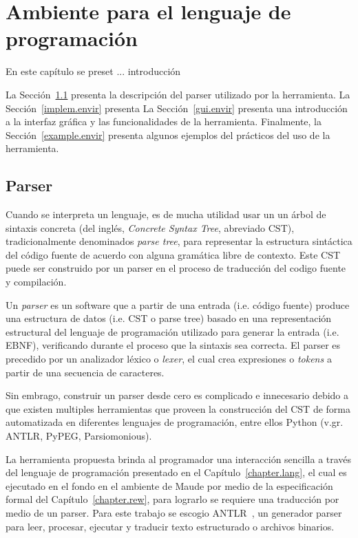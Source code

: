 
\chapter{Ambiente para el lenguaje de programaci\'on}
\label{chapter.envir}


En este cap\'itulo se preset
... introducci\'on

La Secci\'on~\ref{parser.envir} presenta la descripci\'on del parser utilizado por la herramienta. La Secci\'on~\ref{implem.envir} presenta  
La Secci\'on~\ref{gui.envir} presenta una introducci\'on a la interfaz gr\'afica y las funcionalidades de la herramienta. Finalmente, la Secci\'on~\ref{example.envir} presenta algunos ejemplos del pr\'acticos del uso de la herramienta.

\section{Parser}
\label{parser.envir}

Cuando se interpreta un lenguaje, es de mucha utilidad usar un un \'arbol de sintaxis concreta (del ingl\'es, \textit{Concrete Syntax Tree}, abreviado CST), tradicionalmente denominados \textit{parse tree}, para representar la estructura sint\'actica del c\'odigo fuente de acuerdo con alguna gram\'atica libre de contexto. Este CST puede ser construido por un parser en el proceso de traducci\'on del codigo fuente y compilaci\'on. 

Un \textit{parser} es un software que a partir de una entrada (i.e. c\'odigo fuente) produce una estructura de datos (i.e. CST o parse tree) basado en una representaci\'on estructural del lenguaje de programaci\'on utilizado para generar la entrada (i.e. EBNF), verificando durante el proceso que la sintaxis sea correcta. El parser es precedido por un analizador l\'exico o \textit{lexer}, el cual crea expresiones o \textit{tokens} a partir de una secuencia de caracteres. 

Sin embrago, construir un parser desde cero es complicado e innecesario debido a que existen multiples herramientas que proveen la construcci\'on del CST de forma automatizada en diferentes lenguajes de programaci\'on, entre ellos Python (v.gr. ANTLR, PyPEG, Parsiomonious).

La herramienta propuesta brinda al programador una interacci\'on sencilla a trav\'es del lenguaje de programaci\'on presentado en el Cap\'itulo~\ref{chapter.lang}, el cual es ejecutado en el fondo en el ambiente de Maude por medio de la especificaci\'on formal del Cap\'itulo~\ref{chapter.rew}, para lograrlo se requiere una traducci\'on por medio de un parser. Para este trabajo se escogio ANTLR~\cite{Parr:2013:DAR:2501720}, un generador parser para leer, procesar, ejecutar y traducir texto estructurado o archivos binarios.

